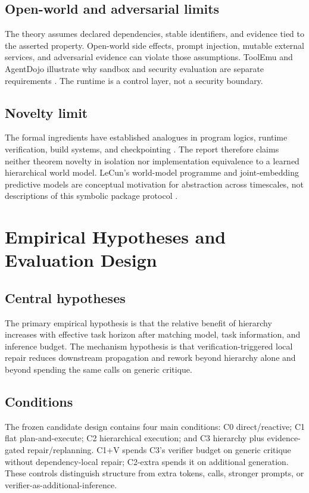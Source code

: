 \documentclass[11pt]{article}
\begin{document}
\subsection{Open-world and adversarial limits}
The theory assumes declared dependencies, stable identifiers, and evidence tied to the asserted property. Open-world side effects, prompt injection, mutable external services, and adversarial evidence can violate those assumptions. ToolEmu and AgentDojo illustrate why sandbox and security evaluation are separate requirements \citep{ruan2024toolemu,debenedetti2024agentdojo}. The runtime is a control layer, not a security boundary.

\subsection{Novelty limit}
The formal ingredients have established analogues in program logics, runtime verification, build systems, and checkpointing \citep{hoare1969axiomatic,leucker2009runtime,mokhov2018build,daly2006higher}. The report therefore claims neither theorem novelty in isolation nor implementation equivalence to a learned hierarchical world model. LeCun's world-model programme and joint-embedding predictive models are conceptual motivation for abstraction across timescales, not descriptions of this symbolic package protocol \citep{lecun2022path,bardes2024vjepa}.

\section{Empirical Hypotheses and Evaluation Design}
\subsection{Central hypotheses}
The primary empirical hypothesis is that the relative benefit of hierarchy increases with effective task horizon after matching model, task information, and inference budget. The mechanism hypothesis is that verification-triggered local repair reduces downstream propagation and rework beyond hierarchy alone and beyond spending the same calls on generic critique.

\subsection{Conditions}
The frozen candidate design contains four main conditions: C0 direct/reactive; C1 flat plan-and-execute; C2 hierarchical execution; and C3 hierarchy plus evidence-gated repair/replanning. C1+V spends C3's verifier budget on generic critique without dependency-local repair; C2-extra spends it on additional generation. These controls distinguish structure from extra tokens, calls, stronger prompts, or verifier-as-additional-inference.
\end{document}
